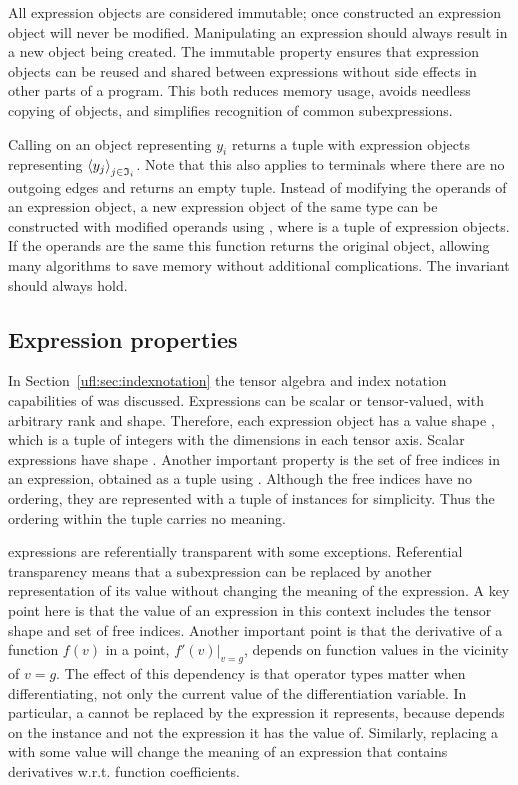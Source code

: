 All expression objects are considered immutable; once constructed an
expression object will never be modified.  Manipulating an expression
should always result in a new object being created.  The immutable
property ensures that expression objects can be reused and shared
between expressions without side effects in other parts of a program.
This both reduces memory usage, avoids needless copying of objects,
and simplifies recognition of common subexpressions.

Calling  on an  object 
representing $y_i$ returns a tuple with expression objects
representing $\left<y_j\right>_{j\in\mathfrak{I}_i}$.  Note that this also
applies to terminals where there are no outgoing edges and
 returns an empty tuple.  Instead of modifying the
operands of an expression object, a new expression object of the same
type can be constructed with modified operands using
, where  is a tuple of
expression objects. If the operands are the same this function returns
the original object, allowing many algorithms to save memory without
additional complications. The invariant
 should always hold.


\subsection{Expression properties}
In Section~\ref{ufl:sec:indexnotation} the tensor algebra and index
notation capabilities of \ufl{} was discussed.  Expressions can be
scalar or tensor-valued, with arbitrary rank and shape. Therefore,
each expression object  has a value shape ,
which is a tuple of integers with the dimensions in each tensor
axis. Scalar expressions have shape \emp{()}. Another important
property is the set of free indices in an expression, obtained as a
tuple using .  Although the free indices have
no ordering, they are represented with a tuple of 
instances for simplicity. Thus the ordering within the tuple carries
no meaning.

\ufl{} expressions are referentially transparent with some
exceptions. Referential transparency means that a subexpression can be
replaced by another representation of its value without changing the
meaning of the expression.  A key point here is that the value of an
expression in this context includes the tensor shape and set of free
indices.  Another important point is that the derivative of a function
$f(v)$ in a point, $f'(v)|_{v=g}$, depends on function values in the
vicinity of $v=g$.  The effect of this dependency is that operator
types matter when differentiating, not only the current value of the
differentiation variable.  In particular, a  cannot be
replaced by the expression it represents, because  depends
on the  instance and not the expression it has the
value of.  Similarly, replacing a  with some value
will change the meaning of an expression that contains derivatives
w.r.t. function coefficients.

